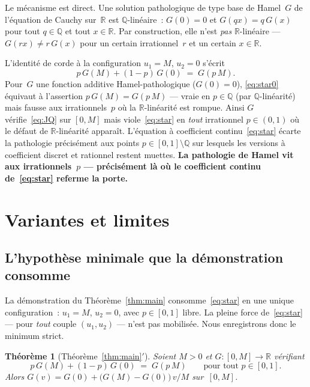 \documentclass[11pt,a4paper]{amsart}
\newtheorem{theorem}{Théorème}
\newcommand{\R}{\mathbb R}
\newcommand{\Q}{\mathbb Q}
\begin{document}
Le mécanisme est direct. Une solution pathologique de type base de
Hamel~$G$ de l'équation de Cauchy sur~$\R$ est $\Q$-linéaire~: $G(0) = 0$
et $G(qx) = q\,G(x)$ pour tout $q \in \Q$ et tout $x \in \R$. Par
construction, elle n'est \emph{pas} $\R$-linéaire --- $G(rx) \neq r\,G(x)$
pour un certain irrationnel~$r$ et un certain $x \in \R$.

L'identité de corde à la configuration $u_1 = M$, $u_2 = 0$ s'écrit
\begin{equation}
p\,G(M) + (1 - p)\,G(0) \;=\; G(p\,M).
\tag{$\star_0$}\label{eq:star0}
\end{equation}
Pour~$G$ une fonction additive Hamel-pathologique ($G(0) = 0$),
\eqref{eq:star0} équivaut à l'assertion $p\,G(M) = G(p\,M)$ --- vraie en
$p \in \Q$ (par $\Q$-linéarité) mais fausse aux irrationnels~$p$ où la
$\R$-linéarité est rompue. Ainsi $G$ vérifie~\eqref{eq:JQ} sur $[0, M]$
mais viole~\eqref{eq:star} en \emph{tout} irrationnel $p \in (0, 1)$ où le
défaut de $\R$-linéarité apparaît. L'équation à coefficient
continu~\eqref{eq:star} écarte la pathologie précisément aux points
$p \in [0, 1] \setminus \Q$ sur lesquels les versions à coefficient discret
et rationnel restent muettes. \textbf{La pathologie de Hamel vit aux
irrationnels~$p$ --- précisément là où le coefficient continu
de~\eqref{eq:star} referme la porte.}

\section{Variantes et limites}
\label{sec:variants}

\subsection{L'hypothèse minimale que la démonstration consomme}
\label{ssec:weak}

La démonstration du Théorème~\ref{thm:main} consomme~\eqref{eq:star} en une
unique configuration~: $u_1 = M$, $u_2 = 0$, avec $p \in [0, 1]$ libre. La
pleine force de~\eqref{eq:star} --- pour \emph{tout} couple $(u_1, u_2)$
--- n'est pas mobilisée. Nous enregistrons donc le minimum strict.

\begin{theorem}[Théorème~\ref{thm:main}$'$]
\label{thm:main-prime}
Soient $M > 0$ et $G\colon[0, M] \to \R$ vérifiant
\[
p\,G(M) + (1 - p)\,G(0) \;=\; G(p\,M)
\qquad \text{pour tout } p \in [0, 1].
\]
Alors $G(v) = G(0) + \bigl(G(M) - G(0)\bigr)\,v/M$ sur~$[0, M]$.
\end{theorem}
\end{document}
